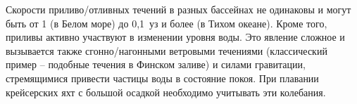 Скорости приливо\-/отливных течений в разных бассейнах не одинаковы и
могут быть от 1 (в Белом море) до 0,1~уз и более (в
Тихом океане). Кроме того, приливы активно участвуют в изменении
уровня воды. Это явление сложное и вызывается также сгонно\-/нагонными
ветровыми течениями (классический пример \--- подобные течения в
Финском заливе) и силами гравитации, стремящимися привести частицы
воды в состояние покоя. При плавании крейсерских яхт с большой осадкой
необходимо учитывать эти колебания.

\onecolumn

